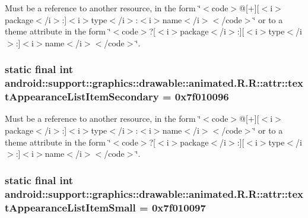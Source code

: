 Must be a reference to another resource, in the form \char`\"{}$<$code$>$@\mbox{[}+\mbox{]}\mbox{[}$<$i$>$package$<$/i$>$:\mbox{]}$<$i$>$type$<$/i$>$:$<$i$>$name$<$/i$>$$<$/code$>$\char`\"{} or to a theme attribute in the form \char`\"{}$<$code$>$?\mbox{[}$<$i$>$package$<$/i$>$:\mbox{]}\mbox{[}$<$i$>$type$<$/i$>$:\mbox{]}$<$i$>$name$<$/i$>$$<$/code$>$\char`\"{}. \hypertarget{classandroid_1_1support_1_1graphics_1_1drawable_1_1animated_1_1_r_1_1attr_d86a71a1f863da3b7a2cd1ac24e19c9b}{
\subsubsection[{textAppearanceListItemSecondary}]{\setlength{\rightskip}{0pt plus 5cm}static final int android::support::graphics::drawable::animated.R.R::attr::textAppearanceListItemSecondary = 0x7f010096}}
\label{classandroid_1_1support_1_1graphics_1_1drawable_1_1animated_1_1_r_1_1attr_d86a71a1f863da3b7a2cd1ac24e19c9b}


Must be a reference to another resource, in the form \char`\"{}$<$code$>$@\mbox{[}+\mbox{]}\mbox{[}$<$i$>$package$<$/i$>$:\mbox{]}$<$i$>$type$<$/i$>$:$<$i$>$name$<$/i$>$$<$/code$>$\char`\"{} or to a theme attribute in the form \char`\"{}$<$code$>$?\mbox{[}$<$i$>$package$<$/i$>$:\mbox{]}\mbox{[}$<$i$>$type$<$/i$>$:\mbox{]}$<$i$>$name$<$/i$>$$<$/code$>$\char`\"{}. \hypertarget{classandroid_1_1support_1_1graphics_1_1drawable_1_1animated_1_1_r_1_1attr_c6316e0dca330f02be70cb9c86e65976}{
\subsubsection[{textAppearanceListItemSmall}]{\setlength{\rightskip}{0pt plus 5cm}static final int android::support::graphics::drawable::animated.R.R::attr::textAppearanceListItemSmall = 0x7f010097}}
\label{classandroid_1_1support_1_1graphics_1_1drawable_1_1animated_1_1_r_1_1attr_c6316e0dca330f02be70cb9c86e65976}


